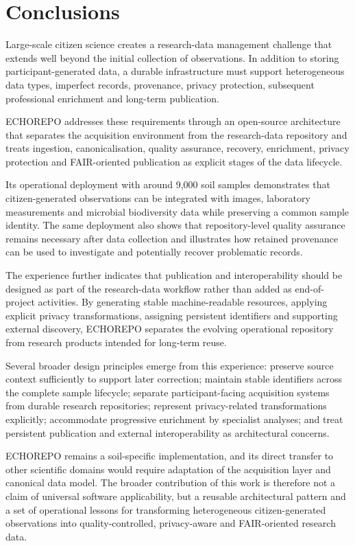 \section{Conclusions}

Large-scale citizen science creates a research-data management challenge that extends well beyond the initial collection of observations. In addition to storing participant-generated data, a durable infrastructure must support heterogeneous data types, imperfect records, provenance, privacy protection, subsequent professional enrichment and long-term publication.

ECHOREPO addresses these requirements through an open-source architecture that separates the acquisition environment from the research-data repository and treats ingestion, canonicalisation, quality assurance, recovery, enrichment, privacy protection and FAIR-oriented publication as explicit stages of the data lifecycle.

Its operational deployment with around 9,000 soil samples demonstrates that citizen-generated observations can be integrated with images, laboratory measurements and microbial biodiversity data while preserving a common sample identity. The same deployment also shows that repository-level quality assurance
remains necessary after data collection and illustrates how retained
provenance can be used to investigate and potentially recover problematic
records.

The experience further indicates that publication and interoperability should be designed as part of the research-data workflow rather than added as end-of-project activities. By generating stable machine-readable resources, applying explicit privacy transformations, assigning persistent identifiers and supporting external discovery, ECHOREPO separates the evolving operational repository from research products intended for long-term reuse.

Several broader design principles emerge from this experience: preserve source context sufficiently to support later correction; maintain stable identifiers across the complete sample lifecycle; separate participant-facing acquisition systems from durable research repositories; represent privacy-related transformations explicitly; accommodate progressive enrichment by specialist analyses; and treat persistent publication and external interoperability as architectural concerns.

ECHOREPO remains a soil-specific implementation, and its direct transfer to other scientific domains would require adaptation of the acquisition layer and canonical data model. The broader contribution of this work is therefore not a claim of universal software applicability, but a reusable architectural pattern and a set of operational lessons for transforming heterogeneous citizen-generated observations into quality-controlled, privacy-aware and FAIR-oriented research data.